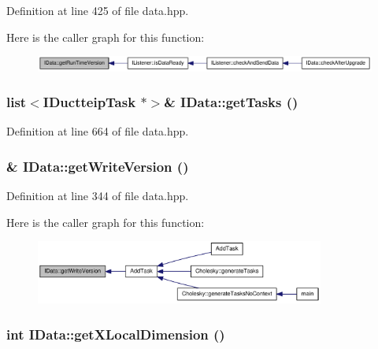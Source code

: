 Definition at line 425 of file data.hpp.

Here is the caller graph for this function:\nopagebreak
\begin{figure}[H]
\begin{center}
\leavevmode
\includegraphics[width=342pt]{class_i_data_af9db5134f13b3c512451eb412c1f5daf_icgraph}
\end{center}
\end{figure}
\hypertarget{class_i_data_afbe3ea7201cffde99df8905830911b43}{
\subsubsection[{getTasks}]{\setlength{\rightskip}{0pt plus 5cm}list$<${\bf IDuctteipTask} $\ast$$>$\& IData::getTasks ()}}
\label{class_i_data_afbe3ea7201cffde99df8905830911b43}


Definition at line 664 of file data.hpp.\hypertarget{class_i_data_a60fc8394c65d93631d9c321b505f37d7}{
\subsubsection[{getWriteVersion}]{\& IData::getWriteVersion ()}}
\label{class_i_data_a60fc8394c65d93631d9c321b505f37d7}


Definition at line 344 of file data.hpp.

Here is the caller graph for this function:\nopagebreak
\begin{figure}[H]
\begin{center}
\leavevmode
\includegraphics[width=269pt]{class_i_data_a60fc8394c65d93631d9c321b505f37d7_icgraph}
\end{center}
\end{figure}
\hypertarget{class_i_data_ab19625c3bf4ba2a2b1b5c3a6ab4ef3ce}{
\subsubsection[{getXLocalDimension}]{\setlength{\rightskip}{0pt plus 5cm}int IData::getXLocalDimension ()}}
\label{class_i_data_ab19625c3bf4ba2a2b1b5c3a6ab4ef3ce}


